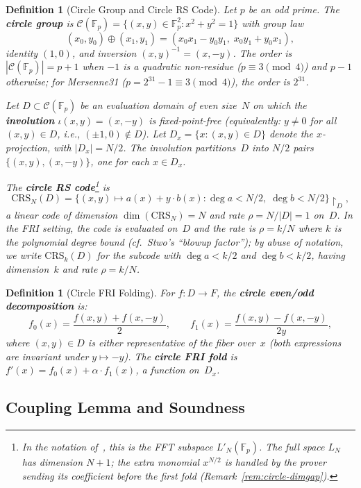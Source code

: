 \documentclass[11pt]{article}
\newtheorem{definition}[theorem]{Definition}
\newcommand{\FF}{\mathbb{F}}
\begin{document}
\begin{definition}[Circle Group and Circle RS Code]
\label{def:circle-code}
Let $p$ be an odd prime. The \textbf{circle group} is $\mathcal{C}(\FF_p) = \{(x,y) \in \FF_p^2 : x^2 + y^2 = 1\}$ with group law
$$(x_0,y_0) \oplus (x_1,y_1) = (x_0 x_1 - y_0 y_1,\; x_0 y_1 + y_0 x_1),$$
identity $(1,0)$, and inversion $(x,y)^{-1} = (x,-y)$. The order is $|\mathcal{C}(\FF_p)| = p+1$ when $-1$ is a quadratic non-residue ($p \equiv 3 \pmod 4$) and $p-1$ otherwise; for Mersenne31 ($p = 2^{31}-1 \equiv 3 \pmod 4$), the order is $2^{31}$.

Let $D \subset \mathcal{C}(\FF_p)$ be an evaluation domain of even size~$N$ on which the \textbf{involution} $\iota(x,y) = (x,-y)$ is fixed-point-free (equivalently: $y \neq 0$ for all $(x,y) \in D$, i.e., $(\pm 1, 0) \notin D$). Let $D_x = \{x : (x,y) \in D\}$ denote the $x$-projection, with $|D_x| = N/2$. The involution partitions~$D$ into $N/2$ pairs $\{(x,y),(x,-y)\}$, one for each $x \in D_x$.

The \textbf{circle RS code}\footnote{In the notation of~\cite{CircleSTARKs}, this is the FFT subspace $L'_N(\FF_p)$. The full space $L_N$ has dimension $N{+}1$; the extra monomial $x^{N/2}$ is handled by the prover sending its coefficient before the first fold (Remark~\ref{rem:circle-dimgap}).} is
$$\mathrm{CRS}_N(D) = \bigl\{(x,y) \mapsto a(x) + y \cdot b(x) : \deg a < N/2,\; \deg b < N/2\bigr\}\!\!\restriction_D,$$
a linear code of dimension $\dim(\mathrm{CRS}_N) = N$ and rate $\rho = N / |D| = 1$ on~$D$. In the FRI setting, the code is evaluated on~$D$ and the rate is $\rho = k/N$ where $k$ is the polynomial degree bound (cf.\ Stwo's ``blowup factor''); by abuse of notation, we write $\mathrm{CRS}_k(D)$ for the subcode with $\deg a < k/2$ and $\deg b < k/2$, having dimension~$k$ and rate $\rho = k/N$.
\end{definition}

\begin{definition}[Circle FRI Folding]
\label{def:circle-folding}
For $f: D \to F$, the \textbf{circle even/odd decomposition} is:
$$f_0(x) = \frac{f(x,y) + f(x,-y)}{2}, \qquad f_1(x) = \frac{f(x,y) - f(x,-y)}{2y},$$
where $(x,y) \in D$ is either representative of the fiber over~$x$ (both expressions are invariant under $y \mapsto -y$). The \textbf{circle FRI fold} is $f'(x) = f_0(x) + \alpha \cdot f_1(x)$, a function on~$D_x$.
\end{definition}

\subsection{Coupling Lemma and Soundness}
\end{document}
